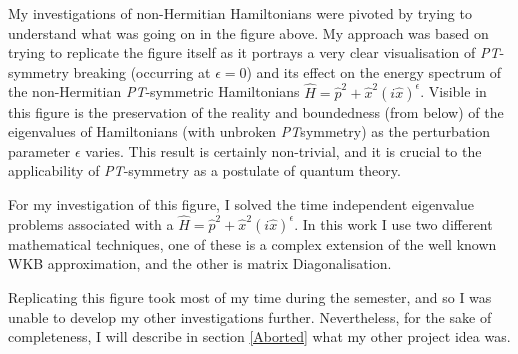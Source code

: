 \documentclass[10pt, a4paper, singlespacing]{report}
\newcommand\PT{\emph{PT}}
\begin{document}
My investigations of non-Hermitian Hamiltonians were pivoted by trying to understand what was going on in the figure above. My approach was based on trying to replicate the figure itself as it portrays a very clear visualisation of \PT-symmetry breaking (occurring at $\epsilon = 0$) and its effect on the energy spectrum of the non-Hermitian \PT-symmetric Hamiltonians $\hat{H} = \hat{p}^2 + \hat{x}^2 (i \hat{x})^{\epsilon}$. Visible in this figure is the preservation of the reality and boundedness (from below) of the eigenvalues of Hamiltonians (with unbroken \PT symmetry) as the perturbation parameter $\epsilon$ varies. This result is certainly non-trivial, and it is crucial to the applicability of \PT-symmetry as a postulate of quantum theory.

For my investigation of this figure, I solved the time independent eigenvalue problems associated with a $\hat{H} = \hat{p}^2 + \hat{x}^2 (i \hat{x})^{\epsilon}$. In this work I use two different mathematical techniques, one of these is a complex extension of the well known WKB approximation, and the other is matrix Diagonalisation.

Replicating this figure took most of my time during the semester, and so I was unable to develop my other investigations further. Nevertheless, for the sake of completeness, I will describe in section \ref{Aborted} what my other project idea was.

\end{document}
